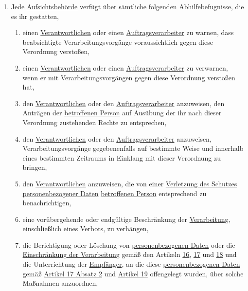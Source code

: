 \begin{enumerate}
\begin{enumerate}
  \end{enumerate}

  \item Jede \hyperref[itm:04-21]{Aufsichtsbehörde} verfügt über sämtliche folgenden Abhilfebefugnisse, die es ihr gestatten,
  \label{itm:58-2}

  \begin{enumerate}
  
    \item einen \hyperref[itm:04-7]{Verantwortlichen} oder einen \hyperref[itm:04-8]{Auftragsverarbeiter} zu warnen, dass beabsichtigte Verarbeitungsvorgänge
     voraussichtlich gegen diese Verordnung verstoßen,
    \label{itm:58-2a}

    \item einen \hyperref[itm:04-7]{Verantwortlichen} oder einen \hyperref[itm:04-8]{Auftragsverarbeiter} zu verwarnen, wenn er mit Verarbeitungsvorgängen gegen
     diese Verordnung verstoßen hat,
    \label{itm:58-2b}

    \item den \hyperref[itm:04-7]{Verantwortlichen} oder den \hyperref[itm:04-8]{Auftragsverarbeiter} anzuweisen, den Anträgen der \hyperref[itm:04-1]{betroffenen Person} auf Ausübung
     der ihr nach dieser Verordnung zustehenden Rechte zu entsprechen,
    \label{itm:58-2c}

    \item den \hyperref[itm:04-7]{Verantwortlichen} oder den \hyperref[itm:04-8]{Auftragsverarbeiter} anzuweisen, Verarbeitungsvorgänge gegebenenfalls auf
     bestimmte Weise und innerhalb eines bestimmten Zeitraums in Einklang mit dieser Verordnung zu bringen,
    \label{itm:58-2d}

    \item den \hyperref[itm:04-7]{Verantwortlichen} anzuweisen, die von einer \hyperref[itm:04-12]{Verletzung des Schutzes personenbezogener Daten} \hyperref[itm:04-1]{betroffenen
     Person} entsprechend zu benachrichtigen,
    \label{itm:58-2e}

    \item eine vorübergehende oder endgültige Beschränkung der \hyperref[itm:04-2]{Verarbeitung}, einschließlich eines Verbots, zu
     verhängen,
    \label{itm:58-2f}

    \item die Berichtigung oder Löschung von \hyperref[itm:04-1]{personenbezogenen Daten} oder die \hyperref[itm:04-3]{Einschränkung der Verarbeitung} gemäß den
     Artikeln \hyperref[ch:16]{16}, \hyperref[ch:17]{17} und \hyperref[ch:17]{18} und die Unterrichtung der \hyperref[itm:04-9]{Empfänger},
     an die diese \hyperref[itm:04-1]{personenbezogenen Daten} gemäß \hyperref[itm:17-2]{Artikel 17 Absatz 2} und \hyperref[ch:19]
     {Artikel 19} offengelegt wurden, über solche Maßnahmen anzuordnen,
    \label{itm:58-2g}


\end{enumerate}
\end{enumerate}

